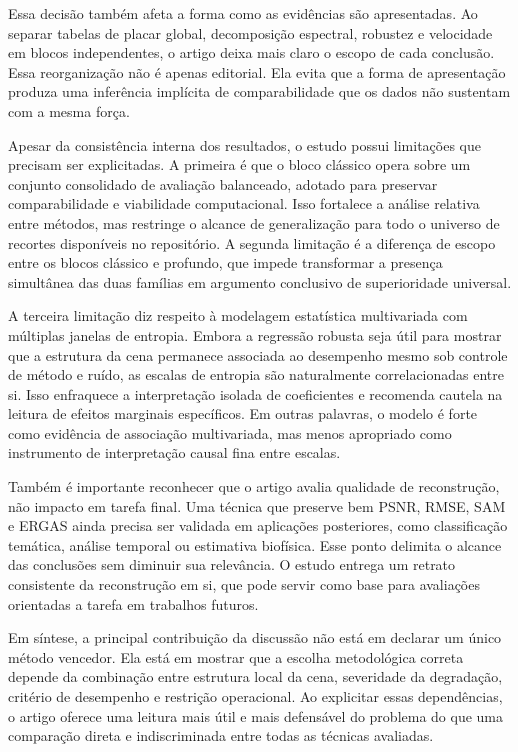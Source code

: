 Essa decisão também afeta a forma como as evidências são apresentadas.
Ao separar tabelas de placar global, decomposição espectral, robustez e velocidade em blocos independentes, o artigo deixa mais claro o escopo de cada conclusão.
Essa reorganização não é apenas editorial.
Ela evita que a forma de apresentação produza uma inferência implícita de comparabilidade que os dados não sustentam com a mesma força.

Apesar da consistência interna dos resultados, o estudo possui limitações que precisam ser explicitadas.
A primeira é que o bloco clássico opera sobre um conjunto consolidado de avaliação balanceado, adotado para preservar comparabilidade e viabilidade computacional.
Isso fortalece a análise relativa entre métodos, mas restringe o alcance de generalização para todo o universo de recortes disponíveis no repositório.
A segunda limitação é a diferença de escopo entre os blocos clássico e profundo, que impede transformar a presença simultânea das duas famílias em argumento conclusivo de superioridade universal.

A terceira limitação diz respeito à modelagem estatística multivariada com múltiplas janelas de entropia.
Embora a regressão robusta seja útil para mostrar que a estrutura da cena permanece associada ao desempenho mesmo sob controle de método e ruído, as escalas de entropia são naturalmente correlacionadas entre si.
Isso enfraquece a interpretação isolada de coeficientes e recomenda cautela na leitura de efeitos marginais específicos.
Em outras palavras, o modelo é forte como evidência de associação multivariada, mas menos apropriado como instrumento de interpretação causal fina entre escalas.

Também é importante reconhecer que o artigo avalia qualidade de reconstrução, não impacto em tarefa final.
Uma técnica que preserve bem \gls{PSNR}, \gls{RMSE}, \gls{SAM} e \gls{ERGAS} ainda precisa ser validada em aplicações posteriores, como classificação temática, análise temporal ou estimativa biofísica.
Esse ponto delimita o alcance das conclusões sem diminuir sua relevância.
O estudo entrega um retrato consistente da reconstrução em si, que pode servir como base para avaliações orientadas a tarefa em trabalhos futuros.

Em síntese, a principal contribuição da discussão não está em declarar um único método vencedor.
Ela está em mostrar que a escolha metodológica correta depende da combinação entre estrutura local da cena, severidade da degradação, critério de desempenho e restrição operacional.
Ao explicitar essas dependências, o artigo oferece uma leitura mais útil e mais defensável do problema do que uma comparação direta e indiscriminada entre todas as técnicas avaliadas.
